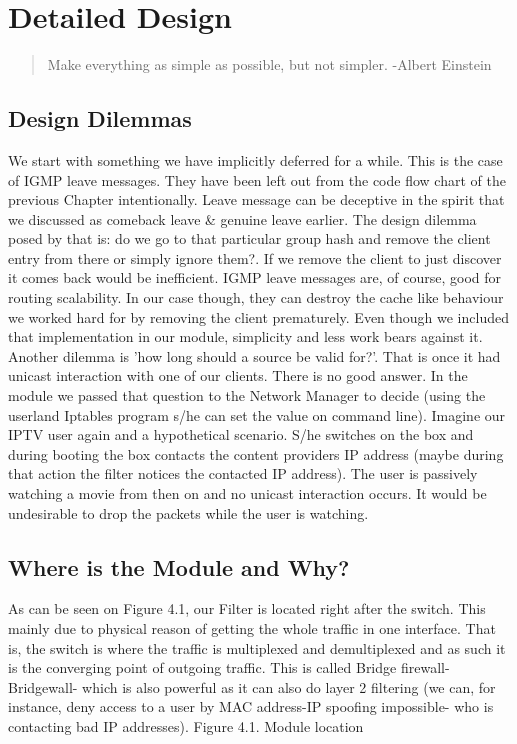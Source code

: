 \chapter{Detailed Design}
\begin{quote}
Make everything as simple as possible, but not simpler.
-Albert Einstein\end{quote}
\section{Design Dilemmas}
We start with something we have implicitly deferred for a while. This is the
case of IGMP leave messages. They have been left out from the code flow chart of
the previous Chapter intentionally. Leave message can be deceptive in the spirit
that we discussed as comeback leave & genuine leave earlier. The design dilemma
posed by that is: do we go to that particular group hash and remove the client
entry from there or simply ignore them?. If we remove the client to just discover
it comes back would be inefficient. IGMP leave messages are, of course, good for
routing scalability. In our case though, they can destroy the cache like behaviour
we worked hard for by removing the client prematurely. Even though we included
that implementation in our module, simplicity and less work bears against it.
Another dilemma is ’how long should a source be valid for?’. That is once it had
unicast interaction with one of our clients. There is no good answer. In the module
we passed that question to the Network Manager to decide (using the userland
Iptables program s/he can set the value on command line). Imagine our IPTV user
again and a hypothetical scenario. S/he switches on the box and during booting
the box contacts the content providers IP address (maybe during that action the
filter notices the contacted IP address). The user is passively watching a movie
from then on and no unicast interaction occurs. It would be undesirable to drop
the packets while the user is watching.
\section{Where is the Module and Why?}
As can be seen on Figure 4.1, our Filter is located right after the switch. This
mainly due to physical reason of getting the whole traffic in one interface. That is,
the switch is where the traffic is multiplexed and demultiplexed and as such it is
the converging point of outgoing traffic. This is called Bridge firewall- Bridgewall-
which is also powerful as it can also do layer 2 filtering (we can, for instance, deny
access to a user by MAC address-IP spoofing impossible- who is contacting bad IP
addresses).
Figure 4.1. Module location
